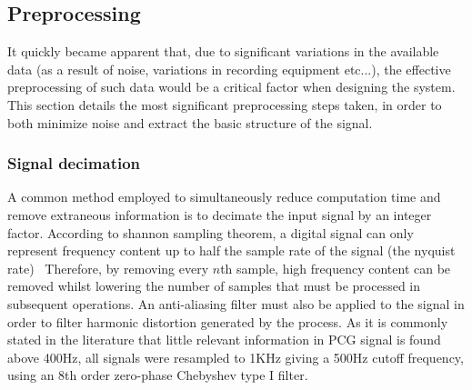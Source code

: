\documentclass[titlepage, 12pt]{scrartcl} \usepackage{enumitem}
\begin{document}

\subsection{Preprocessing}\label{preprocessing}
It quickly became apparent that, due to significant variations in the available
data (as a result of noise, variations in recording equipment etc...), the
effective preprocessing of such data would be a critical factor when designing
the system. This section details the most significant preprocessing steps
taken, in order to both minimize noise and extract the basic structure of the
signal.

\subsubsection{Signal decimation}
A common method employed to simultaneously reduce computation time and remove
extraneous information is to decimate the input signal by an integer factor.
According to shannon sampling theorem, a digital signal can only represent
frequency content up to half the sample rate of the signal (the nyquist
rate)~\parencite[p.140]{Kadis1999}
Therefore, by removing every $n$th sample, high frequency content can be
removed whilst lowering the number of samples that must be processed in
subsequent operations. An anti-aliasing filter must also be applied to the
signal in order to filter harmonic distortion generated by the process.
As it is commonly stated in the literature that little relevant information in
PCG signal is found above 400Hz, all signals were resampled to 1KHz giving a
500Hz cutoff frequency, using an 8th order zero-phase Chebyshev type I filter.
\end{document}
